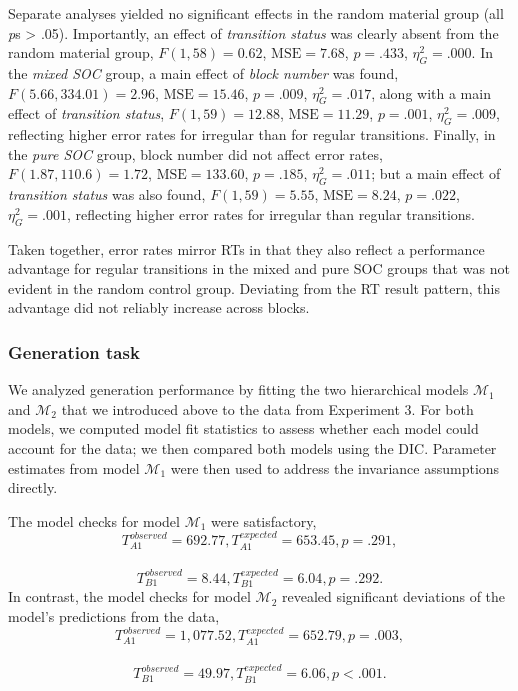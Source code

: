\documentclass[jou]{apa6}
\theoremstyle{definition}
\theoremstyle{definition}
\theoremstyle{definition}
\theoremstyle{remark}
\begin{document}
Separate analyses yielded no significant effects in the random material
group (all \emph{p}s \textgreater{} .05). Importantly, an effect of
\emph{transition status} was clearly absent from the random material
group, \(F(1, 58) = 0.62\), \(\mathrm{MSE} = 7.68\), \(p = .433\),
\(\eta^2_G = .000\). In the \emph{mixed SOC} group, a main effect of
\emph{block number} was found, \(F(5.66, 334.01) = 2.96\),
\(\mathrm{MSE} = 15.46\), \(p = .009\), \(\eta^2_G = .017\), along with
a main effect of \emph{transition status}, \(F(1, 59) = 12.88\),
\(\mathrm{MSE} = 11.29\), \(p = .001\), \(\eta^2_G = .009\), reflecting
higher error rates for irregular than for regular transitions. Finally,
in the \emph{pure SOC} group, block number did not affect error rates,
\(F(1.87, 110.6) = 1.72\), \(\mathrm{MSE} = 133.60\), \(p = .185\),
\(\eta^2_G = .011\); but a main effect of \emph{transition status} was
also found, \(F(1, 59) = 5.55\), \(\mathrm{MSE} = 8.24\), \(p = .022\),
\(\eta^2_G = .001\), reflecting higher error rates for irregular than
regular transitions.

Taken together, error rates mirror RTs in that they also reflect a
performance advantage for regular transitions in the mixed and pure SOC
groups that was not evident in the random control group. Deviating from
the RT result pattern, this advantage did not reliably increase across
blocks.

\subsubsection{Generation task}\label{generation-task-2}

We analyzed generation performance by fitting the two hierarchical
models \(\mathcal{M}_1\) and \(\mathcal{M}_2\) that we introduced above
to the data from Experiment 3. For both models, we computed model fit
statistics to assess whether each model could account for the data; we
then compared both models using the DIC. Parameter estimates from model
\(\mathcal{M}_1\) were then used to address the invariance assumptions
directly.

The model checks for model \(\mathcal{M}_1\) were satisfactory,
\[T_{A1}^{observed} = 692.77, T_{A1}^{expected} = 653.45, p = .291,\]~
\[T_{B1}^{observed} = 8.44, T_{B1}^{expected} = 6.04, p = .292.\] In
contrast, the model checks for model \(\mathcal{M}_2\) revealed
significant deviations of the model's predictions from the data,
\[T_{A1}^{observed} = 1,077.52, T_{A1}^{expected} = 652.79, p = .003,\]~
\[T_{B1}^{observed} = 49.97, T_{B1}^{expected} = 6.06, p < .001.\]
\end{document}
